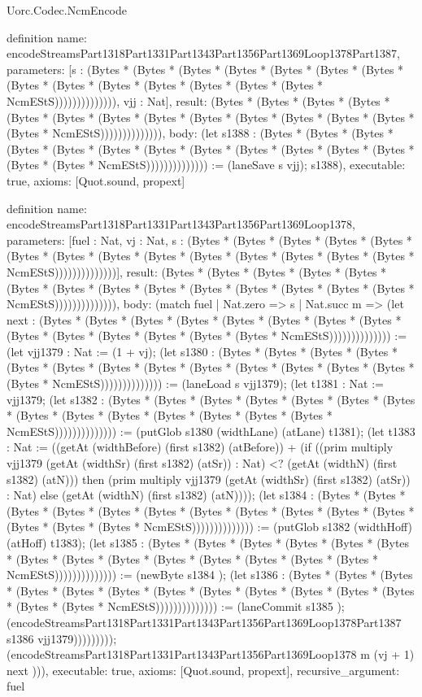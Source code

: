 \begin{lexlean}{Uorc.Codec.NcmEncode}
\begin{semanticmodule}
definition{
  name: encodeStreamsPart1318Part1331Part1343Part1356Part1369Loop1378Part1387,
  parameters: [s : (Bytes * (Bytes * (Bytes * (Bytes * (Bytes * (Bytes * (Bytes * (Bytes * (Bytes * (Bytes * (Bytes * (Bytes * (Bytes * (Bytes * NcmEStS)))))))))))))), vjj : Nat],
  result: (Bytes * (Bytes * (Bytes * (Bytes * (Bytes * (Bytes * (Bytes * (Bytes * (Bytes * (Bytes * (Bytes * (Bytes * (Bytes * (Bytes * NcmEStS)))))))))))))),
  body: (let s1388 : (Bytes * (Bytes * (Bytes * (Bytes * (Bytes * (Bytes * (Bytes * (Bytes * (Bytes * (Bytes * (Bytes * (Bytes * (Bytes * (Bytes * NcmEStS)))))))))))))) := (laneSave s vjj); s1388),
  executable: true,
  axioms: [Quot.sound, propext]
}

definition{
  name: encodeStreamsPart1318Part1331Part1343Part1356Part1369Loop1378,
  parameters: [fuel : Nat, vj : Nat, s : (Bytes * (Bytes * (Bytes * (Bytes * (Bytes * (Bytes * (Bytes * (Bytes * (Bytes * (Bytes * (Bytes * (Bytes * (Bytes * (Bytes * NcmEStS))))))))))))))],
  result: (Bytes * (Bytes * (Bytes * (Bytes * (Bytes * (Bytes * (Bytes * (Bytes * (Bytes * (Bytes * (Bytes * (Bytes * (Bytes * (Bytes * NcmEStS)))))))))))))),
  body: (match fuel
    | Nat.zero => s
    | Nat.succ m => (let next : (Bytes * (Bytes * (Bytes * (Bytes * (Bytes * (Bytes * (Bytes * (Bytes * (Bytes * (Bytes * (Bytes * (Bytes * (Bytes * (Bytes * NcmEStS)))))))))))))) := (let vjj1379 : Nat := (1 + vj); (let s1380 : (Bytes * (Bytes * (Bytes * (Bytes * (Bytes * (Bytes * (Bytes * (Bytes * (Bytes * (Bytes * (Bytes * (Bytes * (Bytes * (Bytes * NcmEStS)))))))))))))) := (laneLoad s vjj1379); (let t1381 : Nat := vjj1379; (let s1382 : (Bytes * (Bytes * (Bytes * (Bytes * (Bytes * (Bytes * (Bytes * (Bytes * (Bytes * (Bytes * (Bytes * (Bytes * (Bytes * (Bytes * NcmEStS)))))))))))))) := (putGlob s1380 (widthLane) (atLane) t1381); (let t1383 : Nat := ((getAt (widthBefore) (first s1382) (atBefore)) + (if ((prim multiply vjj1379 (getAt (widthSr) (first s1382) (atSr)) : Nat) <? (getAt (widthN) (first s1382) (atN))) then (prim multiply vjj1379 (getAt (widthSr) (first s1382) (atSr)) : Nat) else (getAt (widthN) (first s1382) (atN)))); (let s1384 : (Bytes * (Bytes * (Bytes * (Bytes * (Bytes * (Bytes * (Bytes * (Bytes * (Bytes * (Bytes * (Bytes * (Bytes * (Bytes * (Bytes * NcmEStS)))))))))))))) := (putGlob s1382 (widthHoff) (atHoff) t1383); (let s1385 : (Bytes * (Bytes * (Bytes * (Bytes * (Bytes * (Bytes * (Bytes * (Bytes * (Bytes * (Bytes * (Bytes * (Bytes * (Bytes * (Bytes * NcmEStS)))))))))))))) := (newByte s1384 ); (let s1386 : (Bytes * (Bytes * (Bytes * (Bytes * (Bytes * (Bytes * (Bytes * (Bytes * (Bytes * (Bytes * (Bytes * (Bytes * (Bytes * (Bytes * NcmEStS)))))))))))))) := (laneCommit s1385 ); (encodeStreamsPart1318Part1331Part1343Part1356Part1369Loop1378Part1387 s1386 vjj1379))))))))); (encodeStreamsPart1318Part1331Part1343Part1356Part1369Loop1378 m (vj + 1) next ))),
  executable: true,
  axioms: [Quot.sound, propext],
  recursive_argument: fuel
}


\end{semanticmodule}
\end{lexlean}
